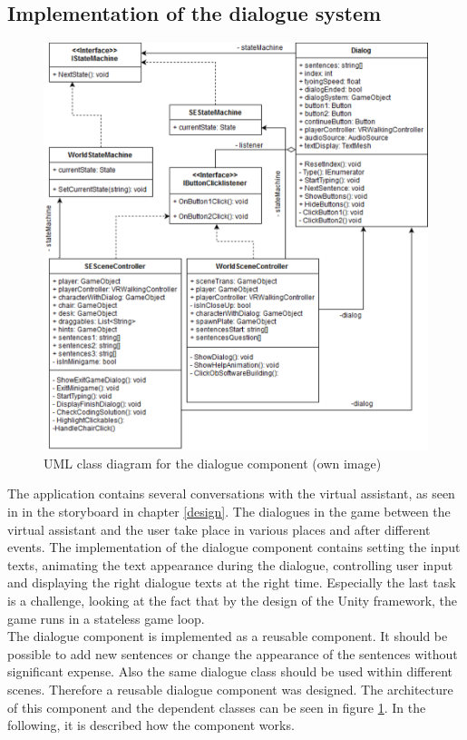 \subsection{Implementation of the dialogue system}
\begin{figure}[h!]
  \includegraphics[width=16cm]{kapitel/eps/uml-dialog.pdf}
  \centering
  \caption{UML class diagram for the dialogue component (own image)}
  \label{fig:uml-controller}
\end{figure}
The application contains several conversations with the virtual assistant, as seen in in the storyboard in chapter \ref{design}. The dialogues in the game between the virtual assistant and the user take place in various places and after different events. The implementation of the dialogue component contains setting the input texts, animating the text appearance during the dialogue, controlling user input and displaying the right dialogue texts at the right time. Especially the last task is a challenge, looking at the fact that by the design of the Unity framework, the game runs in a stateless game loop.\\
 The dialogue component is implemented as a reusable component. It should be possible to add new sentences or change the appearance of the sentences without significant expense. Also the same dialogue class should be used within different scenes. Therefore a reusable dialogue component was designed. The architecture of this component and the dependent classes can be seen in figure \ref{fig:uml-controller}. In the following, it is described how the component works.\\
